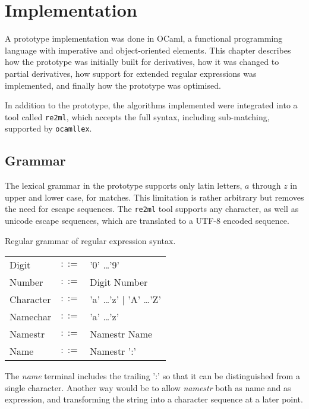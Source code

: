 \chapter{Implementation}
\label{implementation}

A prototype implementation was done in OCaml, a functional programming language
with imperative and object-oriented elements. This chapter describes how the
prototype was initially built for derivatives, how it was changed to partial
derivatives, how support for extended regular expressions was implemented, and
finally how the prototype was optimised.

In addition to the prototype, the algorithms implemented were integrated into a
tool called \texttt{re2ml}, which accepts the full syntax, including
sub-matching, supported by \texttt{ocamllex}.


\section{Grammar}

The lexical grammar in the prototype supports only latin letters, $a$ through
$z$ in upper and lower case, for matches. This limitation is rather arbitrary
but removes the need for escape sequences. The \texttt{re2ml} tool supports any
character, as well as unicode escape sequences, which are translated to a UTF-8
encoded sequence.

\begin{defn}
   \label{defn-gram-reg}
   Regular grammar of regular expression syntax.

   \begin{tabular}{lrl}
      Digit	& $::=$	& '0' \dots '9'				\\
      Number	& $::=$	& Digit Number				\\
      Character	& $::=$	& 'a' \dots 'z' $|$ 'A' \dots 'Z'	\\
      Namechar	& $::=$	& 'a' \dots 'z'				\\
      Namestr	& $::=$	& Namestr Name				\\
      Name	& $::=$	& Namestr ':'				\\
   \end{tabular}
\end{defn}

The \textit{name} terminal includes the trailing ':' so that it can be
distinguished from a single character. Another way would be to allow
\textit{namestr} both as name and as expression, and transforming the string
into a character sequence at a later point.

